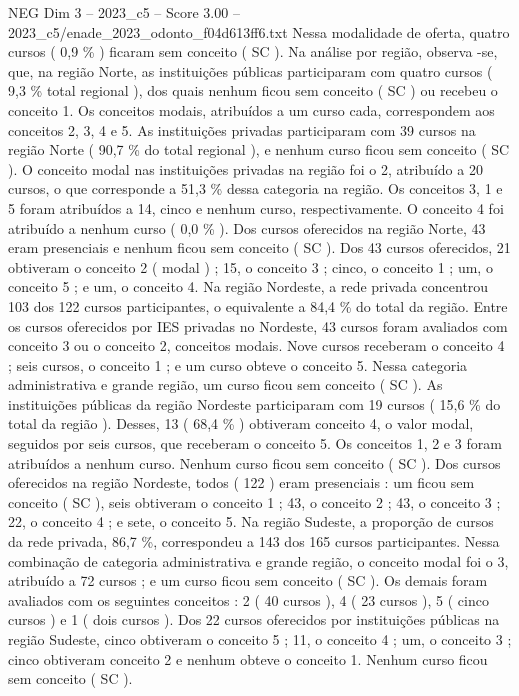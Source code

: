 \begin{textsample}{NEG Dim 3 – 2023\_c5 – Score 3.00 – 2023\_c5/enade\_2023\_odonto\_f04d613ff6.txt}
Nessa modalidade de oferta, quatro cursos ( 0,9 \% ) ficaram sem conceito ( SC ).
Na análise por região, observa -se, que, na região Norte, as instituições públicas participaram com quatro cursos ( 9,3 \% total regional ), dos quais nenhum ficou sem conceito ( SC ) ou recebeu o conceito 1.
Os conceitos modais, atribuídos a um curso cada, correspondem aos conceitos 2, 3, 4 e 5.
As instituições privadas participaram com 39 cursos na região Norte ( 90,7 \% do total regional ), e nenhum curso ficou sem conceito ( SC ).
O conceito modal nas instituições privadas na região foi o 2, atribuído a 20 cursos, o que corresponde a 51,3 \% dessa categoria na região.
Os conceitos 3, 1 e 5 foram atribuídos a 14, cinco e nenhum curso, respectivamente.
O conceito 4 foi atribuído a nenhum curso ( 0,0 \% ).
Dos cursos oferecidos na região Norte, 43 eram presenciais e nenhum ficou sem conceito ( SC ).
Dos 43 cursos oferecidos, 21 obtiveram o conceito 2 ( modal ) ; 15, o conceito 3 ; cinco, o conceito 1 ; um, o conceito 5 ; e um, o conceito 4.
Na região Nordeste, a rede privada concentrou 103 dos 122 cursos participantes, o equivalente a 84,4 \% do total da região.
Entre os cursos oferecidos por IES privadas no Nordeste, 43 cursos foram avaliados com conceito 3 ou o conceito 2, conceitos modais.
Nove cursos receberam o conceito 4 ; seis cursos, o conceito 1 ; e um curso obteve o conceito 5.
Nessa categoria administrativa e grande região, um curso ficou sem conceito ( SC ).
As instituições públicas da região Nordeste participaram com 19 cursos ( 15,6 \% do total da região ).
Desses, 13 ( 68,4 \% ) obtiveram conceito 4, o valor modal, seguidos por seis cursos, que receberam o conceito 5.
Os conceitos 1, 2 e 3 foram atribuídos a nenhum curso.
Nenhum curso ficou sem conceito ( SC ).
Dos cursos oferecidos na região Nordeste, todos ( 122 ) eram presenciais : um ficou sem conceito ( SC ), seis obtiveram o conceito 1 ; 43, o conceito 2 ; 43, o conceito 3 ; 22, o conceito 4 ; e sete, o conceito 5.
Na região Sudeste, a proporção de cursos da rede privada, 86,7 \%, correspondeu a 143 dos 165 cursos participantes.
Nessa combinação de categoria administrativa e grande região, o conceito modal foi o 3, atribuído a 72 cursos ; e um curso ficou sem conceito ( SC ).
Os demais foram avaliados com os seguintes conceitos : 2 ( 40 cursos ), 4 ( 23 cursos ), 5 ( cinco cursos ) e 1 ( dois cursos ).
Dos 22 cursos oferecidos por instituições públicas na região Sudeste, cinco obtiveram o conceito 5 ; 11, o conceito 4 ; um, o conceito 3 ; cinco obtiveram conceito 2 e nenhum obteve o conceito 1.
Nenhum curso ficou sem conceito ( SC ).

\end{textsample}
